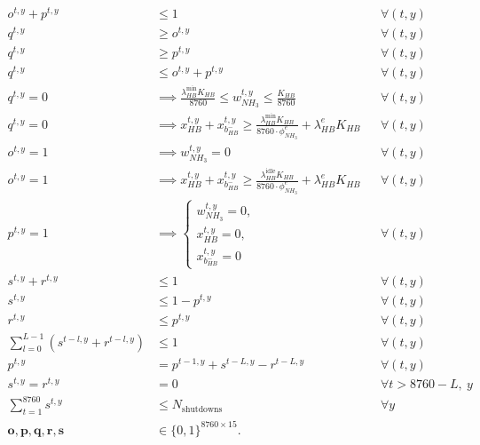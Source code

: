 \documentclass[11pt, letter]{article}
\begin{document}
\begin{subequations}\label{eq:hot_idle_shutdown_constraints}
\begin{align}
o^{t,y} + p^{t,y} &\le 1 && \forall (t,y) \label{eq:z_eta_sum} \\
q^{t,y} &\ge o^{t,y} && \forall (t,y) \label{eq:delta_ge_z} \\
q^{t,y} &\ge p^{t,y} && \forall (t,y) \label{eq:delta_ge_eta} \\
q^{t,y} &\le o^{t,y} + p^{t,y} && \forall (t,y) \label{eq:delta_le_sum} \\
q^{t,y} = 0 &\implies \frac{\lambda_{HB}^{\min} K_{HB}}{8760} \le w_{NH_3}^{t,y} \le \frac{K_{HB}}{8760} && \forall (t,y) \label{eq:delta_zero_prod_bounds} \\
q^{t,y} = 0 &\implies x_{HB}^{t,y} + x_{b^-_{HB}}^{t,y} \ge \frac{\lambda_{HB}^{\min}K_{HB}}{8760 \cdot \phi^e_{NH_3}} + \lambda_{HB}^e K_{HB} && \forall (t,y) \label{eq:delta_zero_power_bound} \\
o^{t,y} = 1 &\implies w_{NH_3}^{t,y} = 0 && \forall (t,y) \label{eq:hotidle_zero_prod} \\
o^{t,y} = 1 &\implies x_{HB}^{t,y} + x_{b^-_{HB}}^{t,y} \ge \frac{\lambda_{HB}^{\mathrm{idle}}K_{HB}}{8760 \cdot \phi^e_{NH_3}} + \lambda^e_{HB} K_{HB}
&& \forall (t,y) \label{eq:hotidle_energy_requirement} \\
p^{t,y} = 1 &\implies 
\begin{cases}
w_{NH_3}^{t,y} = 0,\\
x_{HB}^{t,y} = 0,\\
x_{b^-_{HB}}^{t,y} = 0
\end{cases} && \forall (t,y) \label{eq:shutdown_zero_all} \\
s^{t,y}+r^{t,y} &\le 1 && \forall (t,y) \label{eq:no_simultaneous_transition} \\
s^{t,y} &\le 1-p^{t,y} && \forall (t,y) \label{eq:shutdown_only_if_online} \\
r^{t,y} &\le p^{t,y} && \forall (t,y) \label{eq:restart_only_if_shutdown} \\
\sum_{l=0}^{L-1}\left(s^{t-l,y}+r^{t-l,y}\right) &\le 1 && \forall (t,y) \label{eq:no_overlapping_transitions} \\
p^{t,y} &= p^{t-1,y}+s^{t-L,y}-r^{t-L,y} && \forall (t,y) \label{eq:shutdown_state_transition} \\
s^{t,y}=r^{t,y} &=0 && \forall t>8760-L,\ y \label{eq:no_late_transitions} \\
\sum_{t=1}^{8760} s^{t,y} &\le N_\text{shutdowns} && \forall y \label{eq:max_shutdowns} \\
\boldsymbol{o,p,q,r,s} &\in \{0,1\}^{8760\times 15}. \label{eq:binary}
\end{align}
\end{subequations}
\end{document}
